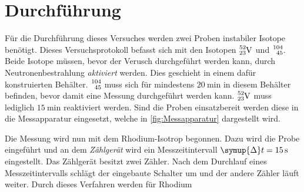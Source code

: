 \section{Durchführung}
\label{sec:Durchführung}
Für die Durchführung dieses Versuches werden zwei Proben instabiler Isotope benötigt. Dieses Versuchsprotokoll befasst sich mit den Isotopen $\ce{^{52}_{23}V}$ und 
$\ce{^{104}_{45}}$. Beide Isotope müssen, bevor der Verusch durchgeführt werden kann, durch Neutronenbestrahlung \textit{aktiviert} werden. Dies geschieht in einem dafür
konstruierten Behälter. $\ce{^{104}_{45}}$ muss sich für mindestens $\qty{20}{\minute}$ in diesem Behälter befinden, bevor damit eine Messung durchgeführt werden kann. 
$\ce{^{52}_{23}V}$ muss lediglich $\qty{15}{\minute}$ reaktiviert werden. Sind die Proben einsatzbereit werden diese in die Messapparatur eingesetzt, welche in
\autoref{fig:Messapparatur} dargestellt wird.  


Die Messung wird nun mit dem Rhodium-Isotrop begonnen. Dazu wird die Probe eingeführt und an dem \textit{Zählgerät} wird ein Messzeitintervall $\symup{\Delta}t = \qty{15}{\second}$
eingestellt. Das Zählgerät besitzt zwei Zähler. Nach dem Durchlauf eines Messzeitintervalls schlägt der eingebaute Schalter um und der andere Zähler läuft weiter. Durch dieses 
Verfahren werden für Rhodium
